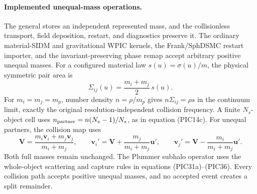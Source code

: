 \paragraph{Implemented unequal-mass operations.}
The general  stores an independent represented mass,
and the collisionless transport, field deposition, restart, and diagnostics
preserve it.  The ordinary material-SIDM and gravitational WPIC kernels, the
Frank/SphDSMC restart importer, and the invariant-preserving phase remap
accept arbitrary positive unequal masses.  For a configured material law
\(s(u)=\sigma(u)/m\), the physical symmetric pair area is
\[
 \boxed{\Sigma_{ij}(u)=\frac{m_i+m_j}{2}\,s(u)}.          \tag{PIC34f}
\]
For \(m_i=m_j=m_p\), number density
\(n=\rho/m_p\) gives
\(n\Sigma_{ij}=\rho s\) in the continuum limit, exactly the original
resolution-independent collision frequency.  A finite \(N_s\)-object cell
uses \(n_{\rm partner}=n(N_s-1)/N_s\), as in equation (PIC14c).  For unequal
partners, the collision map uses
\[
 \bm V=\frac{m_i\bm v_i+m_j\bm v_j}{m_i+m_j},\qquad
 \bm v_i'=\bm V+\frac{m_j}{m_i+m_j}\bm u',\qquad
 \bm v_j'=\bm V-\frac{m_i}{m_i+m_j}\bm u'.                \tag{PIC34g}
\]
Both full masses remain unchanged.  The Plummer subhalo operator uses the
whole-object scattering and capture rules in equations
(PIC31a)--(PIC36).  Every collision path accepts positive unequal masses, and
no accepted event creates a split remainder.

